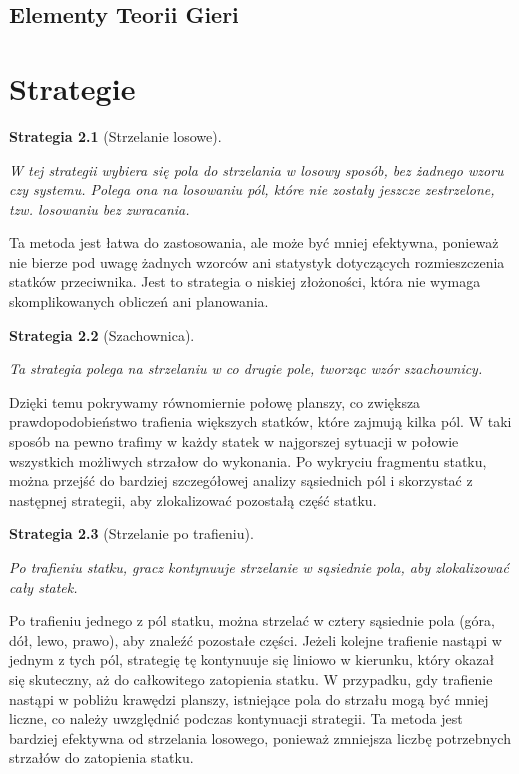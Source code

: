 \documentclass[magisterska]{pracadypl}
\newtheorem{strategy}{Strategia}[section]
\begin{document}
\section{Elementy Teorii Gieri}\chapter{Strategie}

\begin{strategy}[Strzelanie losowe]\cite{yt_1}

W tej strategii wybiera się pola do strzelania w losowy sposób, bez żadnego wzoru czy systemu. 
Polega ona na losowaniu pól, które nie zostały jeszcze zestrzelone, tzw. losowaniu bez zwracania.
\end{strategy}

Ta metoda jest łatwa do zastosowania, ale może być mniej efektywna, 
ponieważ nie bierze pod uwagę żadnych wzorców ani statystyk dotyczących rozmieszczenia statków przeciwnika. 
Jest to strategia o niskiej złożoności, która nie wymaga skomplikowanych obliczeń ani planowania. 

\begin{strategy}[Szachownica]\cite{yt_1}

Ta strategia polega na strzelaniu w co drugie pole, tworząc wzór szachownicy.
\end{strategy}

Dzięki temu pokrywamy równomiernie połowę planszy, co zwiększa prawdopodobieństwo trafienia większych statków, 
które zajmują kilka pól. 
W taki sposób na pewno trafimy w każdy statek w najgorszej sytuacji w połowie wszystkich możliwych strzałow do wykonania. 
Po wykryciu fragmentu statku, 
można przejść do bardziej szczegółowej analizy sąsiednich pól i skorzystać z następnej strategii, 
aby zlokalizować pozostałą część statku.

\begin{strategy}[Strzelanie po trafieniu]\cite{yt_1}

Po trafieniu statku, gracz kontynuuje strzelanie w sąsiednie pola, aby zlokalizować cały statek.
\end{strategy}

Po trafieniu jednego z pól statku, można strzelać w cztery sąsiednie pola (góra, dół, lewo, prawo), 
aby znaleźć pozostałe części. Jeżeli kolejne trafienie nastąpi w jednym z tych pól, 
strategię tę kontynuuje się liniowo w kierunku, który okazał się skuteczny, 
aż do całkowitego zatopienia statku. W przypadku, gdy trafienie nastąpi w pobliżu krawędzi planszy, 
istniejące pola do strzału mogą być mniej liczne, co należy uwzględnić podczas kontynuacji strategii. 
Ta metoda jest bardziej efektywna od strzelania losowego, 
ponieważ zmniejsza liczbę potrzebnych strzałów do zatopienia statku.
\end{document}
